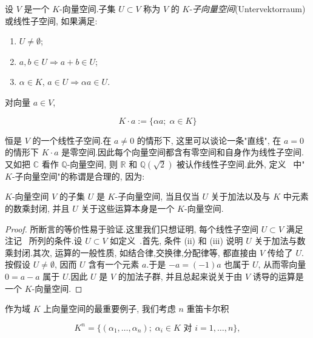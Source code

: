 \begin{definition}[线性子空间]\label{def:1.4.2}
设 $V$ 是一个 $K$-向量空间.子集 $U \subset V$ 称为 $V$ 的 $K$-\emph{子向量空间}(\textup{Untervektorraum})或线性子空间, 如果满足:
\begin{enumerate}
\item[(i)] $U \neq \emptyset$;
\item[(ii)] $a, b \in U \Longrightarrow a + b \in U$;
\item[(iii)] $\alpha \in K$, $a \in U \Longrightarrow \alpha a \in U$.
\end{enumerate}
\end{definition}

对向量 $a \in V$,

\[
K \cdot a := \{\alpha a;\; \alpha \in K\}
\]

恒是 $V$ 的一个线性子空间.在 $a \neq 0$ 的情形下, 这里可以谈论一条"直线", 在 $a = 0$ 的情形下 $K \cdot a$ 是零空间.因此每个向量空间都含有零空间和自身作为线性子空间.又如把 $\mathbb{C}$ 看作 $\mathbb{Q}$-向量空间, 则 $\mathbb{R}$ 和 $\mathbb{Q}(\sqrt{2})$ 被认作线性子空间.此外, 定义~ 中"$K$-子向量空间"的称谓是合理的, 因为:

\begin{remark}[线性子空间的刻画]\label{rem:1.4.3}
$K$-向量空间 $V$ 的子集 $U$ 是 $K$-子向量空间, 当且仅当 $U$ 关于加法以及与 $K$ 中元素的数乘封闭, 并且 $U$ 关于这些运算本身是一个 $K$-向量空间.
\end{remark}

\begin{proof}
所断言的等价性易于验证.这里我们只想证明, 每个线性子空间 $U \subset V$ 满足注记~ 所列的条件.设 $U \subset V$ 如定义~.首先, 条件 (ii) 和 (iii) 说明 $U$ 关于加法与数乘封闭.其次, 运算的一般性质, 如结合律,交换律,分配律等, 都直接由 $V$ 传给了 $U$.按假设 $U \neq \emptyset$, 因而 $U$ 含有一个元素 $a$.于是 $-a = (-1)a$ 也属于 $U$, 从而零向量 $0 = a - a$ 属于 $U$.因此 $U$ 是 $V$ 的加法子群, 并且总起来说关于由 $V$ 诱导的运算是一个 $K$-向量空间.
\end{proof}

作为域 $K$ 上向量空间的最重要例子, 我们考虑 $n$ 重笛卡尔积

\[
K^n = \{(\alpha_1, \ldots, \alpha_n);\; \alpha_i \in K \text{ 对 } i = 1, \ldots, n\},
\]

